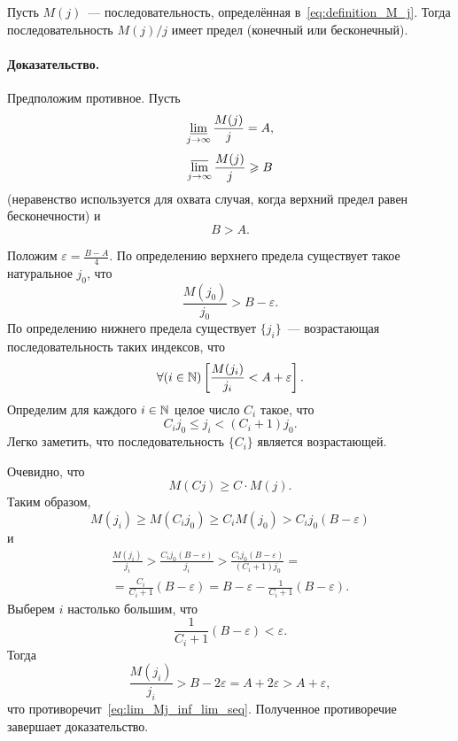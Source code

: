 \begin{theorem}
	Пусть $M(j)$~--- последовательность, определённая в~\eqref{eq:definition_M_j}.
	Тогда последовательность $M(j)/j$ имеет предел (конечный или бесконечный).
\end{theorem}

\paragraph{Доказательство.}
Предположим противное.
Пусть
\begin{equation}
	\varliminf_{j\to\infty}\frac{M(j)}{j} = A,
\end{equation}
\begin{equation}
	\varlimsup_{j\to\infty}\frac{M(j)}{j} \geq B
\end{equation}
(неравенство используется для охвата случая, когда верхний предел равен бесконечности)
и
\begin{equation}
	B > A
	.
\end{equation}

Положим $\varepsilon = \frac{B-A}{4}$.
По определению верхнего предела существует такое натуральное $j_0$,
что
\begin{equation}
	\frac{M(j_0)}{j_0} > B - \varepsilon
	.
\end{equation}
По определению нижнего предела существует $\{j_i\}$~--- возрастающая последовательность таких индексов, что
\begin{equation}
	\label{eq:lim_Mj_inf_lim_seq}
	\forall(i\in\N)\left[ \frac{M(j_i)}{j_i} < A + \varepsilon \right]
	.
\end{equation}
Определим для каждого $i\in\N$ целое число $C_i$ такое, что
\begin{equation}
	\label{eq:lim_Mj_inf_lim_Ci}
	C_i j_0 \leq j_i < (C_i+1)j_0
	.
\end{equation}
Легко заметить, что последовательность $\{C_i\}$ является возрастающей.

Очевидно, что
\begin{equation}
	M(Cj) \geq C \cdot M(j)
	.
\end{equation}
Таким образом,
\begin{equation}
	M(j_i) \geq M(C_i j_0) \geq C_i M(j_0) > C_i j_0 (B-\varepsilon)
\end{equation}
и
\begin{multline}
	\frac{M(j_i)}{j_i} > \frac{C_i j_0 (B-\varepsilon)}{j_i}
	> \frac{C_i j_0 (B-\varepsilon)}{(C_i+1)j_0}
	=
	\\=
	\frac{C_i}{C_i+1}(B-\varepsilon)
	= B-\varepsilon - \frac{1}{C_i+1}(B-\varepsilon)
	.
\end{multline}
Выберем $i$ настолько большим, что
\begin{equation}
	\frac{1}{C_i+1}(B-\varepsilon) < \varepsilon
	.
\end{equation}
Тогда
\begin{equation}
	\frac{M(j_i)}{j_i} > B - 2 \varepsilon = A + 2 \varepsilon > A + \varepsilon
	,
\end{equation}
что противоречит~\eqref{eq:lim_Mj_inf_lim_seq}.
Полученное противоречие завершает доказательство.

